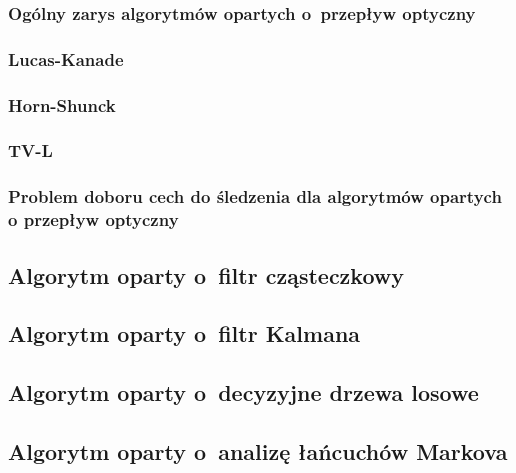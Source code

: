       \subsubsection{Ogólny zarys algorytmów opartych o~przepływ optyczny}
      \cite{OpticalFlowNonPriori05}
      \cite{LucasKanadeTracker81}

      \subsubsection{Lucas-Kanade}
      \cite{OpenCvOpticalFlow04}

      \subsubsection{Horn-Shunck}
      \cite{HornSchunck81}

      \subsubsection{TV-L}
      \cite{TVL107}

      \subsubsection{Problem doboru cech do śledzenia dla algorytmów opartych o przepływ optyczny}
      \cite{GoodFeaturesToTrack94}

    \subsection{Algorytm oparty o~filtr cząsteczkowy}\label{Subsection_ParticleFilter}
      \cite{ParticleFilter05}
      \cite{FingertipParticleFilter11}

    \subsection{Algorytm oparty o~filtr Kalmana}\label{Subsection_Kalman}
      \cite{KalmanFilter95}

    \subsection{Algorytm oparty o~decyzyjne drzewa losowe}\label{Subsection_RandomizedTrees}
      \cite{RandomizedTrees06}
      \cite{TwoStageRandomizedTrees11}

    \subsection{Algorytm oparty o~analizę łańcuchów Markova}\label{Subsection_Vitterbi}
      \cite{HandTrackingVitterbi05}


